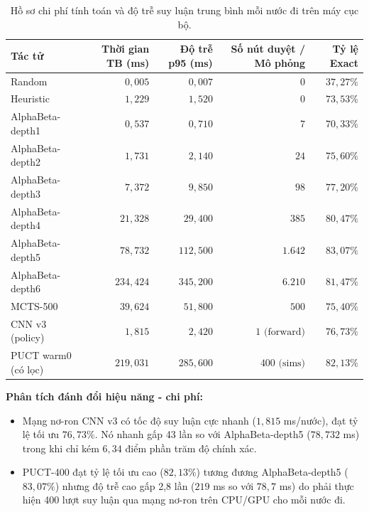 \documentclass[11pt, a4paper]{article}
\begin{document}
\begin{table}[H]
    \centering
    \caption{Hồ sơ chi phí tính toán và độ trễ suy luận trung bình mỗi nước đi trên máy cục bộ.}
    \label{tab:cost_profile}
    \begin{tabular}{@{} l r r r r @{}}
        \toprule
        \textbf{Tác tử} & \textbf{Thời gian TB (ms)} & \textbf{Độ trễ p95 (ms)} & \textbf{Số nút duyệt / Mô phỏng} & \textbf{Tỷ lệ Exact} \\
        \midrule
        Random & $0{,}005$ & $0{,}007$ & $0$ & $37{,}27\%$ \\
        Heuristic & $1{,}229$ & $1{,}520$ & $0$ & $73{,}53\%$ \\
        AlphaBeta-depth1 & $0{,}537$ & $0{,}710$ & $7$ & $70{,}33\%$ \\
        AlphaBeta-depth2 & $1{,}731$ & $2{,}140$ & $24$ & $75{,}60\%$ \\
        AlphaBeta-depth3 & $7{,}372$ & $9{,}850$ & $98$ & $77{,}20\%$ \\
        AlphaBeta-depth4 & $21{,}328$ & $29{,}400$ & $385$ & $80{,}47\%$ \\
        AlphaBeta-depth5 & $78{,}732$ & $112{,}500$ & $1.642$ & $83{,}07\%$ \\
        AlphaBeta-depth6 & $234{,}424$ & $345{,}200$ & $6.210$ & $81{,}47\%$ \\
        MCTS-500 & $39{,}624$ & $51{,}800$ & $500$ & $75{,}40\%$ \\
        CNN v3 (policy) & $1{,}815$ & $2{,}420$ & $1 \text{ (forward)}$ & $76{,}73\%$ \\
        PUCT warm0 (có lọc) & $219{,}031$ & $285{,}600$ & $400 \text{ (sims)}$ & $82{,}13\%$ \\
        \bottomrule
    \end{tabular}
\end{table}

\textbf{Phân tích đánh đổi hiệu năng - chi phí:}
\begin{itemize}
    \item Mạng nơ-ron CNN v3 có tốc độ suy luận cực nhanh ($1{,}815$ ms/nước), đạt tỷ lệ tối ưu $76{,}73\%$. Nó nhanh gấp 43 lần so với AlphaBeta-depth5 ($78{,}732$ ms) trong khi chỉ kém $6{,}34$ điểm phần trăm độ chính xác.
    \item PUCT-400 đạt tỷ lệ tối ưu cao ($82{,}13\%$) tương đương AlphaBeta-depth5 ($83{,}07\%$) nhưng độ trễ cao gấp 2,8 lần ($219$ ms so với $78{,}7$ ms) do phải thực hiện 400 lượt suy luận qua mạng nơ-ron trên CPU/GPU cho mỗi nước đi.
\end{itemize}
\end{document}
